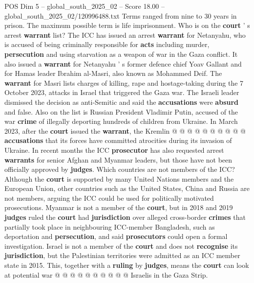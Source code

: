 \begin{textsample}{POS Dim 5 – global\_south\_2025\_02 – Score 18.00 – global\_south\_2025\_02/120996488.txt}
Terms ranged from nine to 30 years in prison.
The maximum possible term is life imprisonment.
Who is on the \textbf{court} ' s arrest \textbf{warrant} list?
The ICC has issued an arrest \textbf{warrant} for Netanyahu, who is accused of being criminally responsible for \textbf{acts} including murder, \textbf{persecution} and using starvation as a weapon of war in the Gaza conflict.
It also issued a \textbf{warrant} for Netanyahu ' s former defence chief Yoav Gallant and for Hamas leader Ibrahim al-Masri, also known as Mohammed Deif.
The \textbf{warrant} for Masri lists charges of killing, rape and hostage-taking during the 7 October 2023, attacks in Israel that triggered the Gaza war.
The Israeli leader dismissed the decision as anti-Semitic and said the \textbf{accusations} were \textbf{absurd} and false.
Also on the list is Russian President Vladimir Putin, accused of the war \textbf{crime} of illegally deporting hundreds of children from Ukraine.
In March 2023, after the \textbf{court} issued the \textbf{warrant}, the Kremlin @ @ @ @ @ @ @ @ @ @ \textbf{accusations} that its forces have committed atrocities during its invasion of Ukraine.
In recent months the ICC \textbf{prosecutor} has also requested arrest \textbf{warrants} for senior Afghan and Myanmar leaders, but those have not been officially approved by \textbf{judges}.
Which countries are not members of the ICC?
Although the \textbf{court} is supported by many United Nations members and the European Union, other countries such as the United States, China and Russia are not members, arguing the ICC could be used for politically motivated prosecutions.
Myanmar is not a member of the \textbf{court}, but in 2018 and 2019 \textbf{judges} ruled the \textbf{court} had \textbf{jurisdiction} over alleged cross-border \textbf{crimes} that partially took place in neighbouring ICC-member Bangladesh, such as deportation and \textbf{persecution}, and said \textbf{prosecutors} could open a formal investigation.
Israel is not a member of the \textbf{court} and does not \textbf{recognise} its \textbf{jurisdiction}, but the Palestinian territories were admitted as an ICC member state in 2015.
This, together with a \textbf{ruling} by \textbf{judges}, means the \textbf{court} can look at potential war @ @ @ @ @ @ @ @ @ @ Israelis in the Gaza Strip.

\end{textsample}
